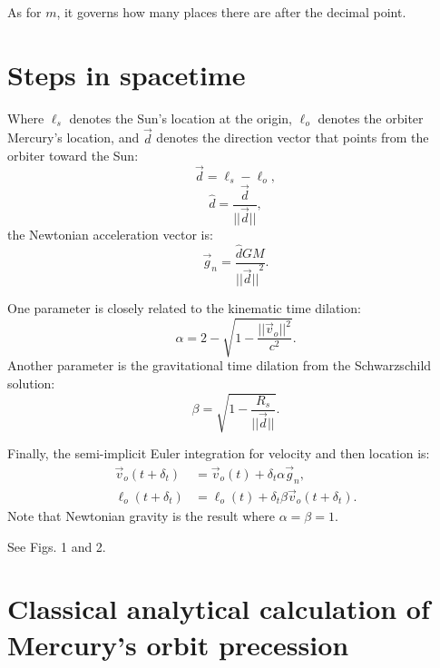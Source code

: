 \documentclass[12pt]{article}
\begin{document}
As for $m$, it governs how many places there are after the decimal point.



\section{Steps in spacetime}

Where $\ell_s$ denotes the Sun's location at the origin, $\ell_o$ denotes the orbiter Mercury's location, and $\vec{d}$ denotes the direction vector that points from the orbiter toward the Sun:
\begin{equation}
\label{direction_vector}
\vec{d} = \ell_{s} - \ell_{o},	
\end{equation}
\begin{equation}
\label{direction_unit_vector}
\hat{d} = \frac{\vec{d}}{\lvert\lvert \vec{d} \rvert\rvert},
\end{equation}
the Newtonian acceleration vector is:
\begin{equation}
\label{newton}
\vec{g}_n = \frac{\hat{d} G M}{{\lvert\lvert \vec{d} \rvert\rvert}^2}.
\end{equation}

One parameter is closely related to the kinematic time dilation:
\begin{equation}
\label{eq_kinematic}
\alpha = 2 - \sqrt{1 - \frac{\lvert\lvert \vec{v}_{o}\rvert\rvert^2}{c^2}}.
\end{equation}
Another parameter is the gravitational time dilation from the Schwarzschild solution:
\begin{equation}
\label{eq_gravitational}
\beta = \sqrt{1 - \frac{R_{s}}{\lvert \lvert \vec{d} \rvert \rvert}}.
\end{equation}

Finally, the semi-implicit Euler integration for velocity and then location is:
\begin{align}
\label{eq_velocity}
\vec{v}_{o}(t + \delta_t) &= \vec{v}_{o}(t) + \delta_{t} \alpha \vec{g}_n, \\
\label{eq_position}
\ell_{o}(t + \delta_t) &= \ell_{o}(t) + \delta_{t} \beta \vec{v}_{o}(t + \delta_t).
\end{align}
Note that Newtonian gravity is the result where $\alpha = \beta = 1$.

See Figs. 1 and 2.





\section{Classical analytical calculation of Mercury's orbit precession}
\end{document}
